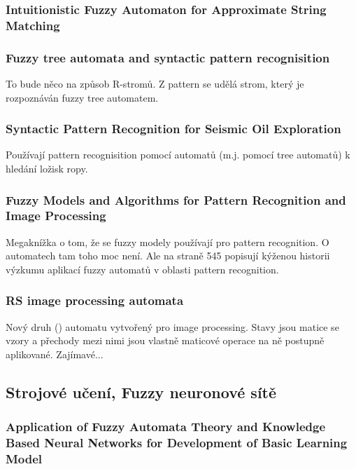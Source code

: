 \documentclass[a4paper,10pt]{article}
\begin{document}
\subsubsection*{Intuitionistic Fuzzy Automaton for Approximate String Matching \cite{RavChoTri-IntFuzzAutApprStrMatch}}

\subsubsection*{Fuzzy tree automata and syntactic pattern recognisition\cite{Lee-FuzzTreeAutSyntPattRec}}
To bude něco na způsob R-stromů. Z pattern se udělá strom, který je rozpoznáván fuzzy tree automatem.

\subsubsection*{Syntactic Pattern Recognition for Seismic Oil Exploration \cite{Hua-SyntPattRecSeisOilExp}}
Používají pattern recognisition pomocí automatů (m.j. pomocí tree automatů) k hledání ložisk ropy.

\subsubsection*{Fuzzy Models and Algorithms for Pattern Recognition and Image Processing \cite{BezKelKriPal-FuzzModAlgPattRecImaProc}}
Megaknížka o tom, že se fuzzy modely používají pro pattern recognition. O automatech tam toho moc není. Ale na straně 545 popisují kýženou historii výzkumu aplikací fuzzy automatů v oblasti pattern recognition.

\subsubsection*{RS image processing automata \cite{Xia-RSImaProcAut}}
Nový druh () automatu vytvořený pro image processing. Stavy jsou matice se vzory a přechody mezi nimi jsou vlastně maticové operace na ně postupně aplikované. Zajímavé...

\subsection{Strojové učení, Fuzzy neuronové sítě}

\subsubsection*{Application of Fuzzy Automata Theory and Knowledge Based Neural Networks for Development of Basic Learning Model \cite{DarAhmSin-AppFuzzAutTheKnBsNeuNetDevBasLeaMod}}
\end{document}
